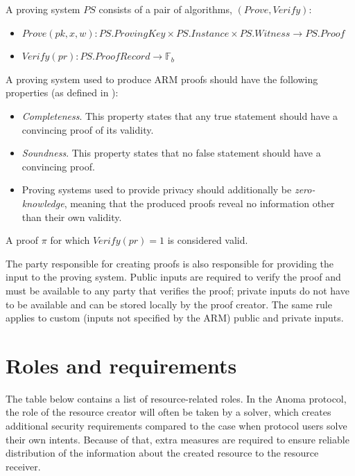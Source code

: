 A proving system $PS$ consists of a pair of algorithms, $(Prove, Verify)$:

\begin{itemize}
    \item $Prove(pk, x, w): PS.ProvingKey \times PS.Instance \times PS.Witness \rightarrow PS.Proof$
    \item $Verify(pr): PS.ProofRecord \rightarrow \mathbb{F}_b$
\end{itemize}

A proving system used to produce ARM proofs should have the following properties (as defined in \cite{thaler}):
\begin{itemize}
    \item \textit{Completeness}. This property states that any true statement should have a convincing proof of its validity.
    \item \textit{Soundness}. This property states that no false statement should have a convincing proof.
    \item Proving systems used to provide privacy should additionally be \textit{zero-knowledge}, meaning that the produced proofs reveal no information other than their own validity.
\end{itemize}

A proof $\pi$ for which $Verify(pr) = 1$ is considered valid.

The party responsible for creating proofs is also responsible for providing the input to the proving system. Public inputs are required to verify the proof and must be available to any party that verifies the proof; private inputs do not have to be available and can be stored locally by the proof creator. The same rule applies to custom (inputs not specified by the ARM) public and private inputs.


\section{Roles and requirements}

The table below contains a list of resource-related roles. In the Anoma protocol, the role of the resource creator will often be taken by a solver, which creates additional security requirements compared to the case when protocol users solve their own intents. Because of that, extra measures are required to ensure reliable distribution of the information about the created resource to the resource receiver. 

